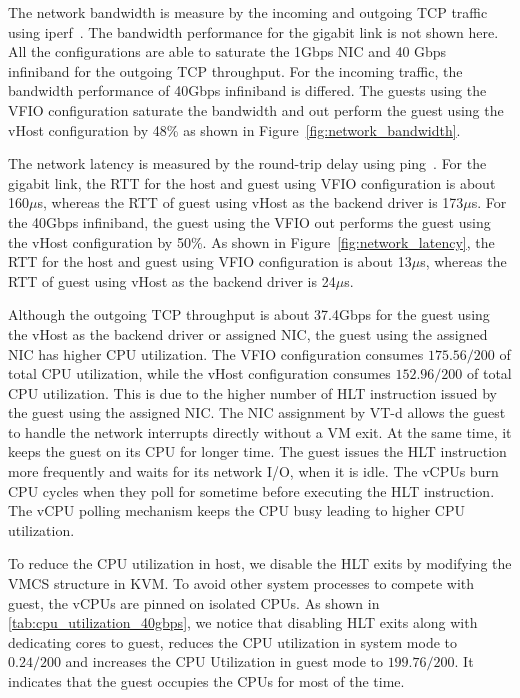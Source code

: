 The network bandwidth is measure by the incoming and outgoing
TCP traffic using iperf~\cite{iperf}. The bandwidth
performance for the gigabit link is not shown here. All the
configurations are able to saturate the 1Gbps NIC and 40 Gbps
infiniband for the outgoing TCP throughput. For the incoming
traffic, the bandwidth performance of 40Gbps infiniband is
differed. The guests using the VFIO configuration saturate the
bandwidth and out perform the guest using the vHost
configuration by 48\% as shown in
Figure~\ref{fig:network_bandwidth}.

The network latency is measured by the round-trip delay using
ping~\cite{ping}. For the gigabit link, the RTT for the host
and guest using VFIO configuration is about 160$\mu$s, whereas
the RTT of guest using vHost as the backend driver is
173$\mu$s. For the 40Gbps infiniband, the guest using the VFIO
out performs the guest using the vHost configuration by 50\%.
As shown in Figure~\ref{fig:network_latency}, the RTT for the
host and guest using VFIO configuration is about 13$\mu$s,
whereas the RTT of guest using vHost as the backend driver is
24$\mu$s.

Although the outgoing TCP throughput is about 37.4Gbps for the
guest using the vHost as the backend driver or assigned NIC,
the guest using the assigned NIC has higher CPU utilization.
The VFIO configuration consumes $175.56/200$ of total CPU
utilization, while the vHost configuration consumes
$152.96/200$ of total CPU utilization. This is due to the
higher number of HLT instruction issued by the guest using the
assigned NIC. The NIC assignment by VT-d allows the guest to
handle the network interrupts directly without a VM exit. At
the same time, it keeps the guest on its CPU for longer time.
The guest issues the HLT instruction more frequently and waits
for its network I/O, when it is idle. The vCPUs burn CPU
cycles when they poll for sometime before executing the HLT
instruction. The vCPU polling mechanism keeps the CPU busy
leading to higher CPU utilization.

To reduce the CPU utilization in host, we disable the HLT
exits by modifying the VMCS structure in KVM. To avoid other
system processes to compete with guest, the vCPUs are pinned
on isolated CPUs. As shown in
\ref{tab:cpu_utilization_40gbps}, we notice that disabling HLT
exits along with dedicating cores to guest, reduces the CPU
utilization in system mode to $0.24/200$ and increases the CPU
Utilization in guest mode to $199.76/200$. It indicates that
the guest occupies the CPUs for most of the time.

